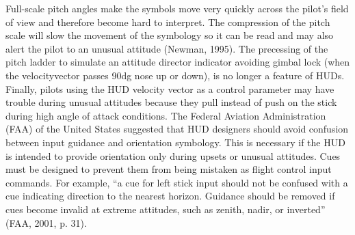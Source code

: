 \documentclass[utf8,bachelor,manualbib]{gradu3}
\begin{document}
Full-scale pitch angles make the symbols move very quickly across the pilot’s
field of view and therefore become hard to interpret. The compression of the pitch
scale will slow the movement of the symbology so it can be read and may also alert
the pilot to an unusual attitude (Newman, 1995). The precessing of the pitch ladder
to simulate an attitude director indicator avoiding gimbal lock (when the velocityvector passes 90dg nose up or down), is no longer a feature of HUDs. Finally, pilots
using the HUD velocity vector as a control parameter may have trouble during unusual
attitudes because they pull instead of push on the stick during high angle of
attack conditions.
The Federal Aviation Administration (FAA) of the United States suggested that
HUD designers should avoid confusion between input guidance and orientation
symbology. This is necessary if the HUD is intended to provide orientation only
during upsets or unusual attitudes. Cues must be designed to prevent them from
being mistaken as flight control input commands. For example, “a cue for left stick
input should not be confused with a cue indicating direction to the nearest horizon.
Guidance should be removed if cues become invalid at extreme attitudes, such as
zenith, nadir, or inverted” (FAA, 2001, p. 31).
\end{document}
